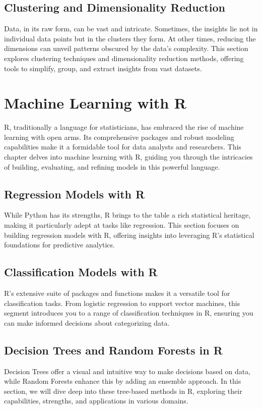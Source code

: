 \documentclass[a4paper,12pt]{book}
\begin{document}
\section{Clustering and Dimensionality Reduction}
Data, in its raw form, can be vast and intricate. Sometimes, the insights lie not in individual data points but in the clusters they form. At other times, reducing the dimensions can unveil patterns obscured by the data's complexity. This section explores clustering techniques and dimensionality reduction methods, offering tools to simplify, group, and extract insights from vast datasets.

\chapter{Machine Learning with R}
R, traditionally a language for statisticians, has embraced the rise of machine learning with open arms. Its comprehensive packages and robust modeling capabilities make it a formidable tool for data analysts and researchers. This chapter delves into machine learning with R, guiding you through the intricacies of building, evaluating, and refining models in this powerful language.

\section{Regression Models with R}
While Python has its strengths, R brings to the table a rich statistical heritage, making it particularly adept at tasks like regression. This section focuses on building regression models with R, offering insights into leveraging R's statistical foundations for predictive analytics.

\section{Classification Models with R}
R's extensive suite of packages and functions makes it a versatile tool for classification tasks. From logistic regression to support vector machines, this segment introduces you to a range of classification techniques in R, ensuring you can make informed decisions about categorizing data.

\section{Decision Trees and Random Forests in R}
Decision Trees offer a visual and intuitive way to make decisions based on data, while Random Forests enhance this by adding an ensemble approach. In this section, we will dive deep into these tree-based methods in R, exploring their capabilities, strengths, and applications in various domains.
\end{document}
